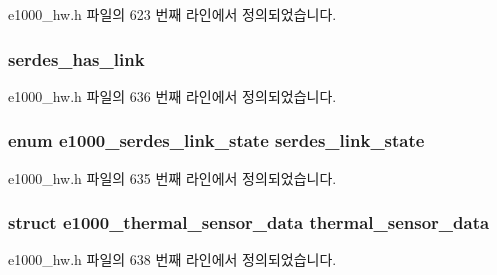 e1000\+\_\+hw.\+h 파일의 623 번째 라인에서 정의되었습니다.

\subsubsection[{\texorpdfstring{serdes\+\_\+has\+\_\+link}{serdes_has_link}}]{ serdes\+\_\+has\+\_\+link}\hypertarget{structe1000__mac__info_a0261cd7a35fe0745ebd5e2178b064673}{}\label{structe1000__mac__info_a0261cd7a35fe0745ebd5e2178b064673}


e1000\+\_\+hw.\+h 파일의 636 번째 라인에서 정의되었습니다.

\subsubsection[{\texorpdfstring{serdes\+\_\+link\+\_\+state}{serdes_link_state}}]{\setlength{\rightskip}{0pt plus 5cm}enum {\bf e1000\+\_\+serdes\+\_\+link\+\_\+state} serdes\+\_\+link\+\_\+state}\hypertarget{structe1000__mac__info_abe5efa4f279c0c110cd84fc0452842f2}{}\label{structe1000__mac__info_abe5efa4f279c0c110cd84fc0452842f2}


e1000\+\_\+hw.\+h 파일의 635 번째 라인에서 정의되었습니다.

\subsubsection[{\texorpdfstring{thermal\+\_\+sensor\+\_\+data}{thermal_sensor_data}}]{\setlength{\rightskip}{0pt plus 5cm}struct {\bf e1000\+\_\+thermal\+\_\+sensor\+\_\+data} thermal\+\_\+sensor\+\_\+data}\hypertarget{structe1000__mac__info_aa744b7687a1fe9a106782767cb572461}{}\label{structe1000__mac__info_aa744b7687a1fe9a106782767cb572461}


e1000\+\_\+hw.\+h 파일의 638 번째 라인에서 정의되었습니다.


